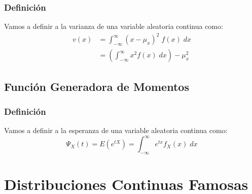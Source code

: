 \documentclass[12pt, fleqn]{report}                             %
\theoremstyle{break}                                            %
\newcommand{\Wrap}[1]           {\left( #1 \right)}             %
\begin{document}
            \subsection{Definición}

                Vamos a definir a la varianza de una variable aleatoria continua como:
                \begin{align*}
                    v(x) 
                        &= \int_{-\infty}^\infty (x - \mu_x)^2 \; f(x) \; dx       \\
                        &= \Wrap{\int_{-\infty}^\infty x^2 f(x) \; dx} - \mu_x^2
                \end{align*}


        \vspace{1em}
        \section{Función Generadora de Momentos}

            \subsection{Definición}

                Vamos a definir a la esperanza de una variable aleatoria continua como:
                \begin{equation*}
                    \Psi_X (t) = E(e^{tX}) = \int_{-\infty}^\infty  e^{tx} f_X (x) \; dx
                \end{equation*}



    \chapter{Distribuciones Continuas Famosas}
\end{document}
